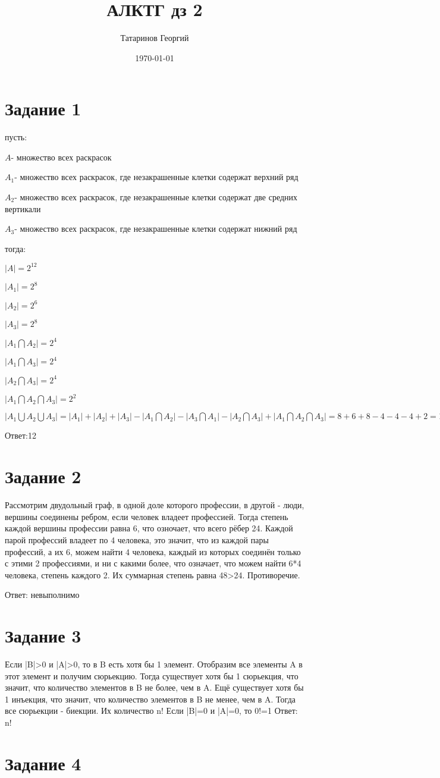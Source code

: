 \documentclass[a4paper, 12pt]{article}
\title{АЛКТГ дз 2}
\author{Татаринов Георгий}
\date{\today}
\renewcommand{\t}[1]{\hspace{#1mm}}
\newcommand{\n}{\par{}}
\renewcommand{\d}{$}
\begin{document}
	\maketitle
	\section*{Задание 1}
		пусть:\n
		\t{11}\d A\d - множество всех раскрасок\n
		\t{11}\d A_1\d - множество всех раскрасок, где незакрашенные клетки содержат верхний ряд\n
		\t{11}\d A_2\d - множество всех раскрасок, где незакрашенные клетки содержат две средних вертикали\n
		\t{11}\d A_3\d - множество всех раскрасок, где незакрашенные клетки содержат нижний ряд\n
		тогда:\n
		\t{11}\d |A|=2^{12} \d\n
		\t{11}\d |A_1|=2^{8} \d\n
		\t{11}\d |A_2|=2^{6} \d\n
		\t{11}\d |A_3|=2^{8} \d\n
		\t{11}\d |A_1\bigcap A_2|=2^{4} \d\n
		\t{11}\d |A_1\bigcap A_3|=2^{4} \d\n
		\t{11}\d |A_2\bigcap A_3|=2^{4} \d\n
		\t{11}\d |A_1\bigcap A_2\bigcap A_3|=2^{2} \d\n
		\d |A_1\bigcup A_2\bigcup A_3|=|A_1|+|A_2|+|A_3|-|A_1\bigcap A_2|-|A_3\bigcap A_1|-|A_2\bigcap A_3|+|A_1\bigcap A_2\bigcap A_3|=8+6+8-4-4-4+2=12\d\n
		Ответ:12
	\section*{Задание 2}
		Рассмотрим двудольный граф, в одной доле которого профессии, в другой - люди, вершины соединены ребром, если человек владеет профессией. Тогда степень каждой вершины профессии равна 6, что озночает, что всего рёбер 24. Каждой парой профессий владеет по 4 человека, это значит, что из каждой пары профессий, а их 6, можем найти 4 человека, каждый из которых соединён только с этими 2 профессиями, и ни с какими более, что означает, что можем найти 6*4 человека, степень каждого 2. Их суммарная степень равна 48>24. Противоречие.\n
		Ответ: невыполнимо
	\section*{Задание 3}
		Если |B|>0 и |A|>0, то в B есть хотя бы 1 элемент. Отобразим все элементы A в этот элемент и получим сюрьекцию. Тогда существует хотя бы 1 сюрьекция, что значит, что количество элементов в B не более, чем в A. Ещё существует хотя бы 1 инъекция, что значит, что количество элементов в B не менее, чем в A. Тогда все сюрьекции - биекции. Их количество n!
		Если |B|=0 и |A|=0, то 0!=1
		Ответ: n!
	\section*{Задание 4}
\end{document}
